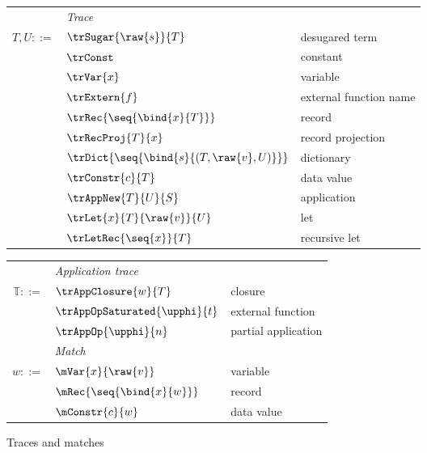 \begin{figure}
\begin{minipage}[t]{0.52\textwidth}
\begin{tabularx}{\textwidth}{rL{2.8cm}L{3.4cm}}
   &\textit{Trace}&
   \\
   $T, U ::=$
   &
   $\trSugar{\raw{s}}{T}$
   &
   desugared term
   \\
   &
   $\trConst$
   &
   constant
   \\
   &
   $\trVar{x}$
   &
   variable
   \\
   &
   $\trExtern{f}$
   &
   external function name
   \\
   &
   $\trRec{\seq{\bind{x}{T}}}$
   &
   record
   \\
   &
   $\trRecProj{T}{x}$
   &
   record projection
   \\
   &
   $\trDict{\seq{\bind{s}{(T, \raw{v}, U)}}}$
   &
   dictionary
   \\
   &
   $\trConstr{c}{T}$
   &
   data value
   \\
   &
   $\trAppNew{T}{U}{S}$
   &
   application
   \\
   &
   $\trLet{x}{T}{\raw{v}}{U}$
   &
   let
   \\
   &
   $\trLetRec{\seq{x}}{T}$
   &
   recursive let
\end{tabularx}
\end{minipage}%
\hspace{6mm}
\begin{minipage}[t]{0.42\textwidth}
\begin{tabularx}{\textwidth}{rL{2.5cm}L{2.9cm}}
   &\textit{Application trace}&
   \\
   $\mathbb{T} ::=$
   &
   $\trAppClosure{w}{T}$
   &
   closure
   \\
   &
   $\trAppOpSaturated{\upphi}{t}$
   &
   external function
   \\
   &
   $\trAppOp{\upphi}{n}$
   &
   partial application
   \\[2mm]
   &\textit{Match}&
   \\
   $w ::=$
   &
   $\mVar{x}{\raw{v}}$
   &
   variable
   \\
   &
   $\mRec{\seq{\bind{x}{w}}}$
   &
   record
   \\
   &
   $\mConstr{c}{w}$
   &
   data value
   \\[14mm]
\end{tabularx}
\end{minipage}
\caption{Traces and matches}
\end{figure}
